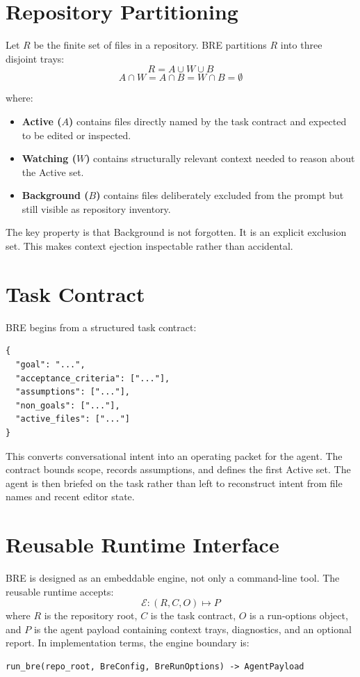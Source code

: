 \documentclass[10pt,twocolumn,letterpaper]{article}
\begin{document}
\section{Repository Partitioning}
Let $R$ be the finite set of files in a repository. BRE partitions $R$ into three disjoint trays:
\begin{equation}
R = A \cup W \cup B
\end{equation}
\begin{equation}
A \cap W = A \cap B = W \cap B = \emptyset
\end{equation}

\noindent where:
\begin{itemize}
    \item \textbf{Active ($A$)} contains files directly named by the task contract and expected to be edited or inspected.
    \item \textbf{Watching ($W$)} contains structurally relevant context needed to reason about the Active set.
    \item \textbf{Background ($B$)} contains files deliberately excluded from the prompt but still visible as repository inventory.
\end{itemize}

The key property is that Background is not forgotten. It is an explicit exclusion set. This makes context ejection inspectable rather than accidental.

\section{Task Contract}
BRE begins from a structured task contract:
\begin{verbatim}
{
  "goal": "...",
  "acceptance_criteria": ["..."],
  "assumptions": ["..."],
  "non_goals": ["..."],
  "active_files": ["..."]
}
\end{verbatim}

This converts conversational intent into an operating packet for the agent. The contract bounds scope, records assumptions, and defines the first Active set. The agent is then briefed on the task rather than left to reconstruct intent from file names and recent editor state.

\section{Reusable Runtime Interface}
BRE is designed as an embeddable engine, not only a command-line tool. The reusable runtime accepts:
\begin{equation}
\mathcal{E}: (R, C, O) \mapsto P
\end{equation}
\noindent where $R$ is the repository root, $C$ is the task contract, $O$ is a run-options object, and $P$ is the agent payload containing context trays, diagnostics, and an optional report. In implementation terms, the engine boundary is:
\begin{verbatim}
run_bre(repo_root, BreConfig, BreRunOptions) -> AgentPayload
\end{verbatim}
\end{document}

